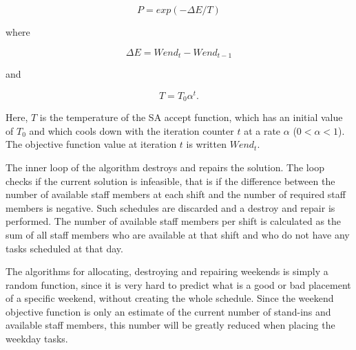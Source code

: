 \begin{equation}
P = exp(-\Delta E/T)
\label{eq0}
\end{equation}

\noindent
where

\begin{equation}
\Delta E = Wend_t - Wend_{t-1}
\label{eq1}
\end{equation}

\noindent
and

\begin{equation}
T = T_0 \alpha^t.
\label{eq2}
\end{equation}

Here, $T$ is the temperature of the SA accept function, which has an initial value of $T_0$ and which cools down with the iteration counter $t$ at a rate $\alpha$ ($0 < \alpha < 1$). The objective function value at iteration $t$ is written $Wend_t$.


The inner loop of the algorithm destroys and repairs the solution. The loop checks if the current solution is infeasible, that is if the difference between the number of available staff members at each shift and the number of required staff members is negative. Such schedules are discarded and a destroy and repair is performed. The number of available staff members per shift is calculated as the sum of all staff members who are available at that shift and who do not have any tasks scheduled at that day.

The algorithms for allocating, destroying and repairing weekends is simply a random function, since it is very hard to predict what is a good or bad placement of a specific weekend, without creating the whole schedule. Since the weekend objective function is only an estimate of the current number of stand-ins and available staff members, this number will be greatly reduced when placing the weekday tasks. 


